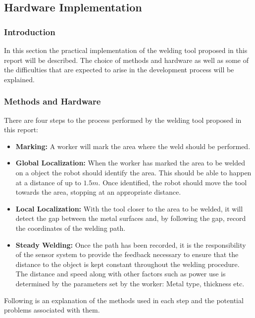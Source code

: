 \subsection{Hardware Implementation}
\subsubsection{Introduction}
In this section the practical implementation of the welding tool proposed in this report will be described. The choice of methods and hardware as well as some of the difficulties that are expected to arise in the development process will be explained.
\subsubsection{Methods and Hardware}
There are four steps to the process performed by the welding tool proposed in this report:
\begin{itemize}
	\item \textbf{Marking:} A worker will mark the area where the weld should be performed.
	\item \textbf{Global Localization:} When the worker has marked the area to be welded on a object the robot should identify the area. This should be able to happen at a distance of up to $1.5m$. Once identified, the robot should move the tool towards the area, stopping at an appropriate distance.
	\item \textbf{Local Localization:} With the tool closer to the area to be welded, it will detect the gap between the metal surfaces and, by following the gap, record the coordinates of the welding path.
	\item \textbf{Steady Welding:} Once the path has been recorded, it is the responsibility of the sensor system to provide the feedback necessary to ensure that the distance to the object is kept constant throughout the welding procedure. The distance and speed along with other factors such as power use is determined by the parameters set by the worker: Metal type, thickness etc.
\end{itemize}
Following is an explanation of the methods used in each step and the potential problems associated with them.
